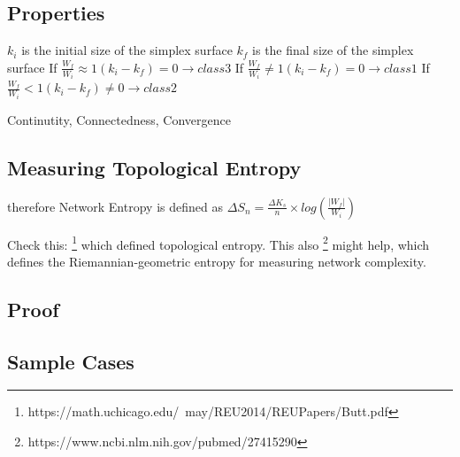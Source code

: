 \subsection{Properties}
$k_i$ is the initial size of the simplex surface\newline
$k_f$ is the final size of the simplex surface\newline
If $\frac{W_f}{W_i} \approx 1 (k_i - k_f) = 0 \rightarrow class3$\newline
If $\frac{W_f}{W_i} \ne 1 (k_i - k_f) = 0 \rightarrow class1$\newline
If $\frac{W_f}{W_i} < 1 (k_i - k_f) \ne 0 \rightarrow class2$\newline

Continutity,
Connectedness,
Convergence

\subsection{Measuring Topological Entropy}
therefore Network Entropy is defined as $\Delta S_n = \frac{\Delta K_s}{n} \times log(\frac{|W_f|}{W_i})$\newline

Check this: \footnote{https://math.uchicago.edu/~may/REU2014/REUPapers/Butt.pdf} which defined topological entropy. This also \footnote{https://www.ncbi.nlm.nih.gov/pubmed/27415290} might help, which defines the Riemannian-geometric entropy for measuring network complexity.

\subsection{Proof}
\subsection{Sample Cases}
